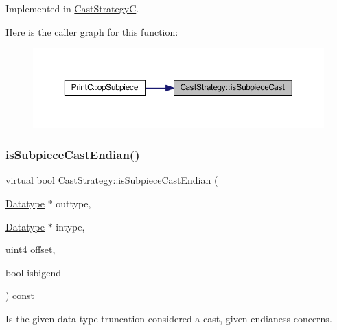 Implemented in \mbox{\hyperlink{class_cast_strategy_c_a24b9433948f1406bfa8503b7d5297415}{Cast\+StrategyC}}.

Here is the caller graph for this function\+:
\nopagebreak
\begin{figure}[H]
\begin{center}
\leavevmode
\includegraphics[width=350pt]{class_cast_strategy_a1297e8653f09779c450e99ba43909e3a_icgraph}
\end{center}
\end{figure}
\mbox{\label{class_cast_strategy_a349f166237fd4cd8f3d01b276a21138a}} 
\subsubsection{\texorpdfstring{isSubpieceCastEndian()}{isSubpieceCastEndian()}}
{\footnotesize\ttfamily virtual bool Cast\+Strategy\+::is\+Subpiece\+Cast\+Endian (\begin{DoxyParamCaption}\item[{\mbox{\hyperlink{class_datatype}{Datatype}} $\ast$}]{outtype,  }\item[{\mbox{\hyperlink{class_datatype}{Datatype}} $\ast$}]{intype,  }\item[{uint4}]{offset,  }\item[{bool}]{isbigend }\end{DoxyParamCaption}) const\hspace{0.3cm}{\ttfamily [pure virtual]}}



Is the given data-\/type truncation considered a cast, given endianess concerns. 


